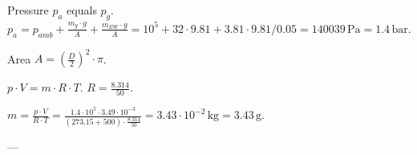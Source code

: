 Pressure \( p_a \) equals \( p_g \).  
\( p_a = p_{amb} + \frac{m_g \cdot g}{A} + \frac{m_{EW} \cdot g}{A} = 10^5 + 32 \cdot 9.81 + 3.81 \cdot 9.81 / 0.05 = 140039 \, \text{Pa} = 1.4 \, \text{bar} \).  

Area \( A = \left(\frac{D}{2}\right)^2 \cdot \pi \).  

\( p \cdot V = m \cdot R \cdot T \).  
\( R = \frac{8.314}{50} \).  

\( m = \frac{p \cdot V}{R \cdot T} = \frac{1.4 \cdot 10^5 \cdot 3.49 \cdot 10^{-3}}{(273.15 + 500) \cdot \frac{8.314}{50}} = 3.43 \cdot 10^{-2} \, \text{kg} = 3.43 \, \text{g} \).  

---